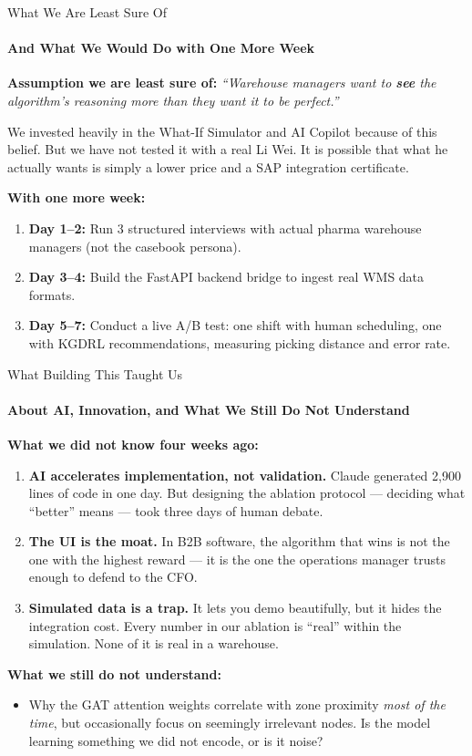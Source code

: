 \documentclass{beamer}
\begin{document}
\begin{frame}{What We Are Least Sure Of}
  \framesubtitle{And What We Would Do with One More Week}
  \small

  \textbf{Assumption we are least sure of:} \textit{``Warehouse managers want to \textbf{see} the algorithm's reasoning more than they want it to be perfect.''}

  \vspace{0.15cm}
  We invested heavily in the What-If Simulator and AI Copilot because of this belief. But we have not tested it with a real Li Wei. It is possible that what he actually wants is simply a lower price and a SAP integration certificate.

  \vspace{0.25cm}
  \textbf{With one more week:}
  \begin{enumerate}
    \item \textbf{Day 1--2:} Run 3 structured interviews with actual pharma warehouse managers (not the casebook persona).
    \item \textbf{Day 3--4:} Build the FastAPI backend bridge to ingest real WMS data formats.
    \item \textbf{Day 5--7:} Conduct a live A/B test: one shift with human scheduling, one with KGDRL recommendations, measuring picking distance and error rate.
  \end{enumerate}
\end{frame}

\begin{frame}{What Building This Taught Us}
  \framesubtitle{About AI, Innovation, and What We Still Do Not Understand}
  \small

  \textbf{What we did not know four weeks ago:}
  \begin{enumerate}
    \item \textbf{AI accelerates implementation, not validation.} Claude generated 2,900 lines of code in one day. But designing the ablation protocol --- deciding what ``better'' means --- took three days of human debate.
    \item \textbf{The UI is the moat.} In B2B software, the algorithm that wins is not the one with the highest reward --- it is the one the operations manager trusts enough to defend to the CFO.
    \item \textbf{Simulated data is a trap.} It lets you demo beautifully, but it hides the integration cost. Every number in our ablation is ``real'' within the simulation. None of it is real in a warehouse.
  \end{enumerate}

  \vspace{0.2cm}
  \textbf{What we still do not understand:}
  \begin{itemize}
    \item Why the GAT attention weights correlate with zone proximity \textit{most of the time}, but occasionally focus on seemingly irrelevant nodes. Is the model learning something we did not encode, or is it noise?
  \end{itemize}
\end{frame}
\end{document}
